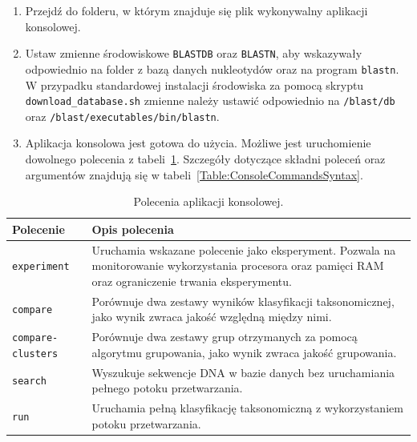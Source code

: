                 \begin{enumerate}
                    \item {
                        Przejdź do folderu, w którym znajduje się plik wykonywalny aplikacji konsolowej.
                    }
                    \item {
                        Ustaw zmienne środowiskowe \texttt{BLASTDB} oraz \texttt{BLASTN}, aby wskazywały odpowiednio na folder z bazą danych nukleotydów oraz na program \texttt{blastn}.
                        W przypadku standardowej instalacji środowiska za pomocą skryptu \texttt{download\_database.sh} zmienne należy ustawić odpowiednio na \texttt{/blast/db} oraz \texttt{/blast/executables/bin/blastn}.
                    }
                    \item {
                        Aplikacja konsolowa jest gotowa do użycia. Możliwe jest uruchomienie dowolnego polecenia z tabeli~\ref{Table:ConsoleCommands}. Szczegóły dotyczące składni poleceń oraz argumentów znajdują się w tabeli~\ref{Table:ConsoleCommandsSyntax}.
                    }
                \end{enumerate}

                \begin{table}[!ht] \centering
                    \caption{Polecenia aplikacji konsolowej.}\label{Table:ConsoleCommands}

                    \begin{tabularx}{\textwidth}{| >{\footnotesize}m{} |  >{\footnotesize}X |}
                        \hline
                        \textbf{\normalsize Polecenie}  & \textbf{\normalsize Opis polecenia} \\ \hline \hline
                        \texttt{experiment} 	        & Uruchamia wskazane polecenie jako eksperyment. Pozwala na monitorowanie wykorzystania procesora oraz pamięci RAM oraz ograniczenie trwania eksperymentu. \\ \hline
                        \texttt{compare}		        & Porównuje dwa zestawy wyników klasyfikacji taksonomicznej, jako wynik zwraca jakość względną między nimi. \\ \hline
                        \texttt{compare-clusters} 	    & Porównuje dwa zestawy grup otrzymanych za pomocą algorytmu grupowania, jako wynik zwraca jakość grupowania. \\ \hline
                        \texttt{search}                 & Wyszukuje sekwencje DNA w bazie danych bez uruchamiania pełnego potoku przetwarzania. \\ \hline
                        \texttt{run}		            & Uruchamia pełną klasyfikację taksonomiczną z wykorzystaniem potoku przetwarzania. \\ \hline
                    \end{tabularx}

                \end{table}


